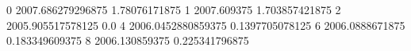 0 2007.686279296875 1.78076171875
1 2007.609375 1.703857421875
2 2005.905517578125 0.0
4 2006.0452880859375 0.1397705078125
6 2006.0888671875 0.183349609375
8 2006.130859375 0.225341796875
